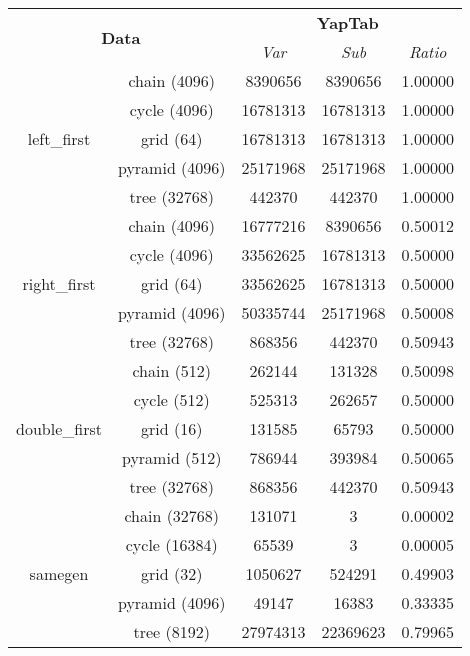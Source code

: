 \begin{table}[ht]
\centering
\small{
  \begin{tabular}{cc|ccc}
   \hline
    \hline
    \multicolumn{2}{c|}{\multirow{2}{*}{\normalsize{\textbf{Data}}}} & \multicolumn{3}{c}{\normalsize{\textbf{YapTab}}} \\
     \multicolumn{2}{c|}{} & \textit{\small{Var}} & \textit{\small{Sub}} & \textit{\small{Ratio}} \\
   \hline
   \hline
   
   \multirow{5}{*}{left\_first} &  \footnotesize{chain (4096)} &  8390656 & 8390656 &  1.00000 \\
   &  \footnotesize{cycle (4096)} &  16781313 & 16781313 &  1.00000 \\
   &  \footnotesize{grid (64)} &  16781313 & 16781313 &  1.00000 \\
   &  \footnotesize{pyramid (4096)} &  25171968 & 25171968 &  1.00000 \\
   &  \footnotesize{tree (32768)} &  442370 & 442370 &  1.00000 \\
   \hline

   \multirow{5}{*}{right\_first} &  \footnotesize{chain (4096)} &  16777216 & 8390656 &  0.50012 \\
   &  \footnotesize{cycle (4096)} &  33562625 & 16781313 &  0.50000 \\
   &  \footnotesize{grid (64)} &  33562625 & 16781313 &  0.50000 \\
   &  \footnotesize{pyramid (4096)} &  50335744 & 25171968 &  0.50008 \\
   &  \footnotesize{tree (32768)} &  868356 & 442370 &  0.50943 \\
   \hline
   
   \multirow{5}{*}{double\_first} &  \footnotesize{chain (512)} &  262144 & 131328 &  0.50098 \\
   &  \footnotesize{cycle (512)} &  525313 & 262657 &  0.50000 \\
   &  \footnotesize{grid (16)} &  131585 & 65793 &  0.50000 \\
   &  \footnotesize{pyramid (512)} &  786944 & 393984 &  0.50065 \\
   &  \footnotesize{tree (32768)} &  868356 & 442370 &  0.50943 \\
   \hline
   
   \multirow{5}{*}{samegen} &  \footnotesize{chain (32768)} &  131071 & 3 &  0.00002 \\
   &  \footnotesize{cycle (16384)} &  65539 & 3 &  0.00005 \\
   &  \footnotesize{grid (32)} &  1050627 & 524291 &  0.49903 \\
   &  \footnotesize{pyramid (4096)} &  49147 & 16383 &  0.33335 \\
   &  \footnotesize{tree (8192)} &  27974313 & 22369623 &  0.79965 \\
   \hline
   

\end{tabular}}
\end{table}
